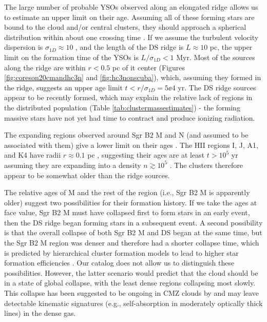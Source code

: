 \documentclass[twocolumn]{aastex61}
\begin{document}
The large number of probable YSOs observed along an elongated ridge allows us
to estimate an upper limit on their age.  Assuming all of these forming stars
are bound to the cloud and/or central clusters, they should approach a
spherical distribution within about one crossing time \citep{Efremov1998a}.  If
we assume the turbulent velocity dispersion is $\sigma_{1D}\approx10$ \kms
\citep[e.g.,][]{Henshaw2016a}, and the length of the DS ridge is $L\approx10$
pc, the upper limit on the formation time of the YSOs is $L/\sigma_{1D}<1$ Myr.
Most of the sources along the ridge are within $r<0.5$ pc of it center (Figures
\ref{fig:coreson20cmandhc3n} and \ref{fig:hc3nonscuba}), which, assuming they
formed in the ridge, suggests an upper age limit $t<r/\sigma_{1D}=5\ee{4}$ yr.
The DS ridge sources appear to be recently formed, which may explain the
relative lack of \hii regions in the distributed population (Table
\ref{tab:clustermassestimates}) - the forming massive stars have not yet had
time to contract and produce ionizing radiation.

The expanding \hii regions observed around Sgr B2 M and N (and assumed to be
associated with them) give a lower limit on their ages \citep[assuming steady
expansion, which may not be a correct model;][]{Peters2010b,De-Pree2014a}.  The
HII regions I, J, A1, and K4 have radii $r\approx0.1$ pc \citep{Gaume1995a},
suggesting their ages are at least $t>10^5$ yr assuming they are expanding into
a density $n\gtrsim10^5$ \percc \citep{De-Pree1995a,Schmiedeke2016a}.  The
clusters therefore appear to be somewhat older than the ridge sources.


The relative ages of M and the rest of the region (i.e., Sgr B2 M is apparently
older) suggest two possibilities for their formation history.  If we take the
ages at face value, Sgr B2 M must have collapsed first to form stars in an
early event, then the DS ridge began forming stars in a
subsequent event.  A second possibility is that the overall collapse of both Sgr B2
M and DS began at the same time, but the Sgr B2 M region was denser and
therefore had a shorter collapse time, which is predicted by hierarchical
cluster formation models to lead to higher star formation efficiencies
\citep{Kruijssen2012a}.  Our catalog does not allow us to distinguish these
possibilities.  However, the latter scenario would predict that the cloud
should be in a state of global collapse, with the least dense regions
collapsing most slowly.  This collapse has been suggested to be ongoing in CMZ
clouds by \citet{Walker2015a,Walker2016a} and may leave detectable kinematic
signatures (e.g., self-absorption in moderately optically thick lines) in the
dense gas.
\end{document}
